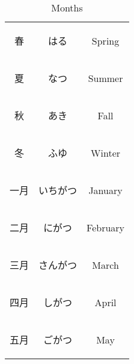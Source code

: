\begin{center}
\begin{table}[H]
	\centering
	\label{qr3}
	\caption{Months }
	\begin{tabular}{ccc}
		\toprule
		{\begin{CJK}{UTF8}{min} 春 \end{CJK}} & {\begin{CJK}{UTF8}{min} はる \end{CJK}} & Spring \\
		{\begin{CJK}{UTF8}{min} 夏 \end{CJK}} & {\begin{CJK}{UTF8}{min} なつ \end{CJK}} & Summer \\
		{\begin{CJK}{UTF8}{min} 秋 \end{CJK}} & {\begin{CJK}{UTF8}{min} あき \end{CJK}} & Fall \\
		{\begin{CJK}{UTF8}{min} 冬 \end{CJK}} & {\begin{CJK}{UTF8}{min} ふゆ \end{CJK}} & Winter \\
		\midrule
		{\begin{CJK}{UTF8}{min} 一月 \end{CJK}} & {\begin{CJK}{UTF8}{min} いちがつ \end{CJK}} & January \\
		{\begin{CJK}{UTF8}{min} 二月 \end{CJK}} & {\begin{CJK}{UTF8}{min} にがつ \end{CJK}} & February \\
		{\begin{CJK}{UTF8}{min} 三月 \end{CJK}} & {\begin{CJK}{UTF8}{min} さんがつ \end{CJK}} & March \\
		{\begin{CJK}{UTF8}{min} 四月 \end{CJK}} & {\begin{CJK}{UTF8}{min} しがつ \end{CJK}} & April \\
		{\begin{CJK}{UTF8}{min} 五月 \end{CJK}} & {\begin{CJK}{UTF8}{min} ごがつ \end{CJK}} & May \\

\end{tabular}
\end{table}
\end{center}
